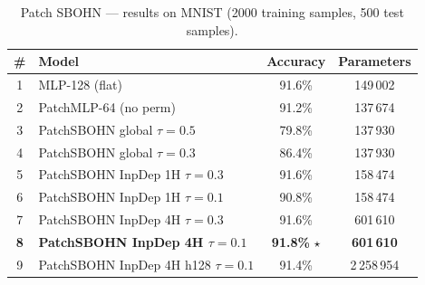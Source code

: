 \begin{table}[h]
\centering
\caption{Patch SBOHN --- results on MNIST (2000 training samples, 500 test samples).}
\begin{tabular}{clcc}
\hline
\# & \textbf{Model} & \textbf{Accuracy} & \textbf{Parameters} \\
\hline
1 & MLP-128 (flat) & 91.6\% & 149\,002 \\
2 & PatchMLP-64 (no perm) & 91.2\% & 137\,674 \\
3 & PatchSBOHN global $\tau{=}0.5$ & 79.8\% & 137\,930 \\
4 & PatchSBOHN global $\tau{=}0.3$ & 86.4\% & 137\,930 \\
5 & PatchSBOHN InpDep 1H $\tau{=}0.3$ & 91.6\% & 158\,474 \\
6 & PatchSBOHN InpDep 1H $\tau{=}0.1$ & 90.8\% & 158\,474 \\
7 & PatchSBOHN InpDep 4H $\tau{=}0.3$ & 91.6\% & 601\,610 \\
\textbf{8} & \textbf{PatchSBOHN InpDep 4H $\tau{=}0.1$} & \textbf{91.8\%} $\star$ & \textbf{601\,610} \\
9 & PatchSBOHN InpDep 4H h128 $\tau{=}0.1$ & 91.4\% & 2\,258\,954 \\
\hline
\end{tabular}
\end{table}
